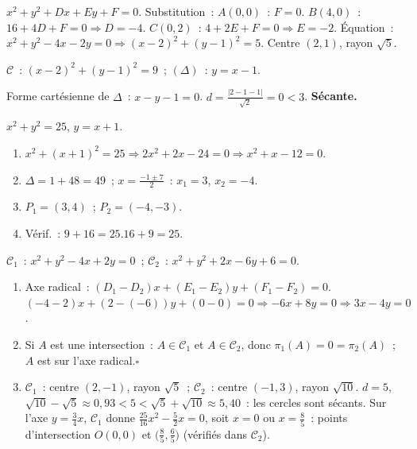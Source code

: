 
$x^2+y^2+Dx+Ey+F=0$. Substitution~:
$A(0,0)$~: $F=0$.
$B(4,0)$~: $16+4D+F=0\Rightarrow D=-4$.
$C(0,2)$~: $4+2E+F=0\Rightarrow E=-2$.
\'Equation~: $x^2+y^2-4x-2y=0\Rightarrow(x-2)^2+(y-1)^2=5$.
Centre $(2,1)$, rayon $\sqrt{5}$.


$\mathcal{C}$~: $(x-2)^2+(y-1)^2=9$~; $(\Delta)$~: $y=x-1$.

Forme cart\'esienne de $\Delta$~: $x-y-1=0$.
$d=\frac{|2-1-1|}{\sqrt{2}}=0<3$.
\textbf{S\'ecante.}


$x^2+y^2=25$, $y=x+1$.
\begin{enumerate}
  \item $x^2+(x+1)^2=25\Rightarrow2x^2+2x-24=0\Rightarrow x^2+x-12=0$.
  \item $\Delta=1+48=49$~; $x=\frac{-1\pm7}{2}$~: $x_1=3$, $x_2=-4$.
  \item $P_1=(3,4)$~; $P_2=(-4,-3)$.
  \item V\'erif.~: $9+16=25$.\checkmark\quad $16+9=25$.\checkmark
\end{enumerate}


$\mathcal{C}_1$~: $x^2+y^2-4x+2y=0$~; $\mathcal{C}_2$~: $x^2+y^2+2x-6y+6=0$.
\begin{enumerate}
  \item Axe radical~: $(D_1-D_2)x+(E_1-E_2)y+(F_1-F_2)=0$.
        $(-4-2)x+(2-(-6))y+(0-0)=0\Rightarrow-6x+8y=0\Rightarrow3x-4y=0$.
  \item Si $A$ est une intersection~: $A\in\mathcal{C}_1$ et $A\in\mathcal{C}_2$,
        donc $\pi_1(A)=0=\pi_2(A)$~; $A$ est sur l'axe radical.\hfill$\square$
  \item $\mathcal{C}_1$~: centre $(2,-1)$, rayon $\sqrt{5}$~; $\mathcal{C}_2$~: centre $(-1,3)$, rayon $\sqrt{10}$.
        $d=5$, $\sqrt{10}-\sqrt5\approx0{,}93<5<\sqrt5+\sqrt{10}\approx5{,}40$~: les cercles sont s\'ecants.
        Sur l'axe $y=\frac34x$, $\mathcal{C}_1$ donne $\frac{25}{16}x^2-\frac52x=0$, soit $x=0$ ou $x=\frac85$~:
        points d'intersection $O(0,0)$ et $\bigl(\frac85,\frac65\bigr)$ (v\'erifi\'es dans $\mathcal{C}_2$).
\end{enumerate}

